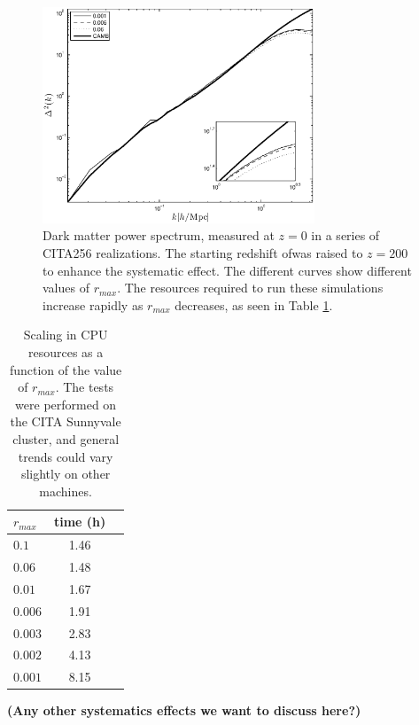\begin{figure}%
  \begin{center}
    \includegraphics[width=3.2in]{graphs/power_ra_max.eps}
  \caption{Dark matter power spectrum, measured at $z=0$ in a series of CITA256 realizations. 
 The starting redshift ofwas raised to $z=200$ to enhance the systematic effect. The different curves show different values of $r_{max}$. 
  The resources required to run these simulations increase rapidly as $r_{max}$ decreases, as seen in Table \ref{table:ra_max}.    \label{fig:ra_max}}
\end{center}
\end{figure}

\begin{table}
\begin{center}
\caption{Scaling in {\small CPU} resources as a function of the value of $r_{max}$. The tests were performed 
on the CITA Sunnyvale cluster, and general trends could vary slightly on other machines.}
\begin{tabular}{|l|c|c|}
\hline 
$r_{max}$         & time (h)   \\                 
\hline
 $0.1$ & 1.46 \\
 $0.06$ & 1.48\\
 $0.01$ & 1.67 \\
 $0.006$ & 1.91\\
 $0.003$ & 2.83 \\
 $0.002$ & 4.13\\
 $0.001$ & 8.15\\
\hline
\end{tabular}
\label{table:ra_max}
\end{center}
\end{table}


{\bf (Any other systematics effects we want to discuss here?)}

 


